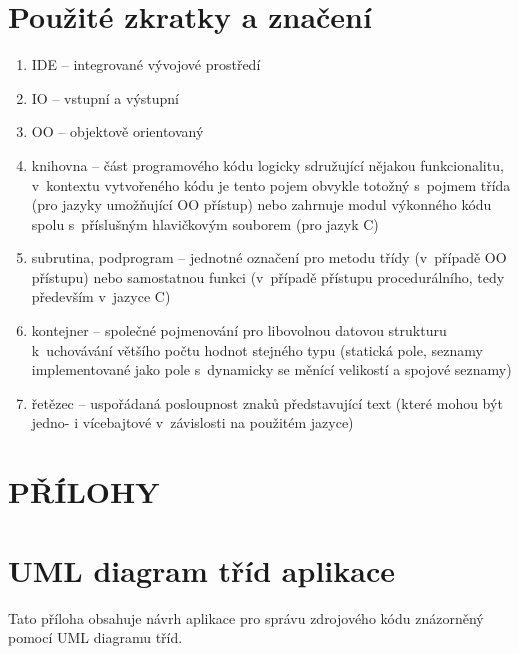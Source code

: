 \documentclass[czech,BP]{thesiskiv}
\begin{document}
% 
%

{\raggedright\small

}

\chapter*{Použité zkratky a značení}
\begin{enumerate}
\item{IDE -- integrované vývojové prostředí}
\item{IO -- vstupní a výstupní}
\item{OO -- objektově orientovaný}
\item{knihovna -- část programového kódu logicky sdružující nějakou funkcionalitu, v~kontextu vytvořeného kódu je tento pojem obvykle totožný s~pojmem třída (pro jazyky umožňující OO přístup) nebo zahrnuje modul výkonného kódu spolu s~příslušným hlavičkovým souborem (pro jazyk C)}
\item{subrutina, podprogram -- jednotné označení pro metodu třídy (v~případě OO přístupu) nebo samostatnou funkci (v~případě přístupu procedurálního, tedy především v~jazyce C)}
\item{kontejner -- společné pojmenování pro libovolnou datovou strukturu k~uchovávání většího počtu hodnot stejného typu (statická pole, seznamy implementované jako pole s~dynamicky se měnící velikostí a spojové seznamy)}
\item{řetězec -- uspořádaná posloupnost znaků představující text (které mohou být jedno- i vícebajtové v~závislosti na použitém jazyce)}
\end{enumerate}

\appendix
\chapter*{PŘÍLOHY}
\chapter{UML diagram tříd aplikace}\label{sec:uml-diagram}
Tato příloha obsahuje návrh aplikace pro správu zdrojového kódu znázorněný pomocí UML diagramu tříd.
\end{document}
